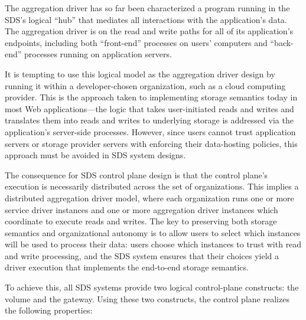 The aggregation driver has so far been characterized a program running in the 
SDS's logical ``hub''
that mediates all interactions with the application's data.  The aggregation
driver is on the read and write paths for all of its application's endpoints, including
both ``front-end'' processes on users' computers and
``back-end'' processes running on application servers.

It is tempting to use this logical model as the aggregation driver design by
running it within a developer-chosen organization, such as a cloud computing
provider.  This is the approach taken to implementing storage semantics today
in most Web applications---the logic that takes user-initiated reads and writes and
translates them into reads and writes to underlying storage is addressed via
the application's server-side processes.  However, since users cannot trust 
application servers or storage provider servers with
enforcing their data-hosting policies, this approach must be avoided in SDS
system designs.

The consequence for SDS control plane design is that the control plane's
execution is necessarily distributed across the set of organizations.  This
implies a distributed aggregation driver model, where each organization runs
one or more service driver instances and one or more aggregation driver
instances which coordinate to execute reads and writes.
The key to preserving both storage semantics and organizational
autonomy is to allow users to select which instances will be used to process
their data:  users choose which instances to trust with read and write
processing, and the SDS system ensures that their choices yield a driver
execution that implements the end-to-end storage semantics.

To achieve this, all SDS systems provide two logical control-plane
constructs: the volume and the gateway.  Using these two constructs, the control
plane realizes the following properties:

